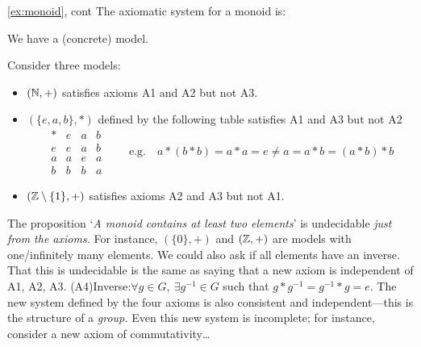 \begin{example*}{\ref{ex:monoid}, cont}{}
	The axiomatic system for a monoid is:
	\begin{description}\itemsep0pt
		\item[\normalfont\emph{Consistent}] We have a (concrete) model.
		\item[\normalfont\emph{Independent}] Consider three models:
		\begin{itemize}\itemsep0pt
		  \item $(\mathbb{N},+)$ satisfies axioms A1 and A2 but not A3.
		  \item $(\{e,a,b\},*)$ defined by the following table satisfies A1 and A3 but not A2
		  \[
		  	\begin{array}{c||ccc}
		  		*&e&a&b\\\hline\hline
		  		e&e&a&b\\
		  		a&a&e&a\\
		  		b&b&b&a
		  	\end{array}
		  	\qquad \text{e.g.}\quad 
		  	a*(b*b)=a*a=e\neq a=a*b=(a*b)*b
		  	\]
		  \item $(\mathbb{Z}\setminus\{1\},+)$ satisfies axioms A2 and A3 but not A1.
		\end{itemize}
		\item[\normalfont\emph{Incomplete}] The proposition `\emph{A monoid contains at least two elements}' is undecidable \emph{just from the axioms.} For instance, $(\{0\},+)$ and $(\mathbb{Z},+)$ are models with one/infinitely many elements.\smallbreak
		  We could also ask if all elements have an inverse. That this is undecidable is the same as saying that a new axiom is independent of A1, A2, A3.\smallbreak
		  \lstsp\lstsp\lstsp(A4)\lstsp Inverse:\quad $\forall g\in G,\ \exists g^{-1}\in G$ such that $g\ast g^{-1}=g^{-1}\ast g=e$.\smallbreak
		The new system defined by the four axioms is also consistent and independent---this is the structure of a \emph{group.} Even this new system is incomplete; for instance, consider a new axiom of commutativity\ldots
	\end{description} 
\end{example*}


\goodbreak


